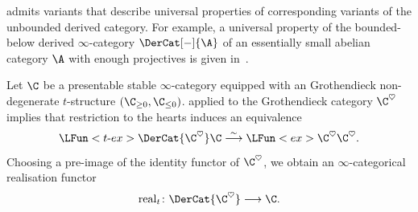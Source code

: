\documentclass[a4paper]{amsart}
\begin{document}
\begin{remark}
   admits variants that describe universal
  properties of corresponding variants of the unbounded derived category. For
  example, a universal property of the bounded-below derived $\infty$-category
  $\DerCat[-]{\A}$ of an essentially small abelian category $\A$ with enough
  projectives is given in~\cite[Theorem~1.3.3.2]{Lur17}.
\end{remark}

\begin{example}
  \label{ex:realisation_unbounded}
  Let $\C$ be a presentable stable $\infty$-category equipped with an Groth\-en\-dieck
  non-degenerate $t$-structure $(\C_{\geq0},\C_{\leq0})$.
   applied to the Groth\-en\-dieck category $\C^\heartsuit$
  implies that restriction to the hearts induces an equivalence
  \[
    \LFun<\text{$t$-}ex>{\DerCat{\C^\heartsuit}}{\C}\stackrel{\sim}{\longrightarrow}\LFun<ex>{\C^\heartsuit}{\C^\heartsuit}.
  \]
  Choosing a pre-image of the identity functor of $\C^\heartsuit$, we obtain an
  $\infty$-categorical realisation functor
  \[
    \operatorname{real}_t\colon\DerCat{\C^\heartsuit}\longrightarrow\C.
  \]
\end{example}
\end{document}
